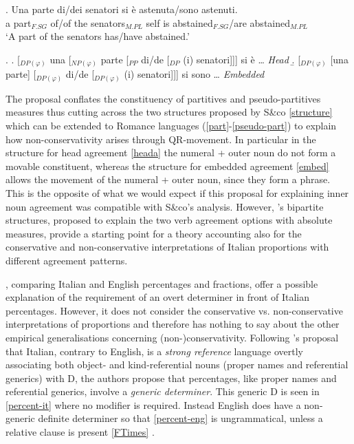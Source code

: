 \documentclass[charis, linguex]{glossa}
\newcommand{\citesax}[1]{\citeauthor{#1}'s \citeyearpar{#1}}
\begin{document}
\exg. Una parte di/dei senatori si è astenuta/sono astenuti. \\
      a   part$_{F.SG}$ of/{of the} senators$_{M.PL}$ self is abstained$_{F.SG}$/are abstained$_{M.PL}$ \\
	 \glt `A part of the senators has/have abstained.' \label{senator}

\ex. \a. [$_{DP(\varphi)}$ una [$_{NP(\varphi)}$ parte [$_{PP}$ di/de [$_{DP}$ (i) senatori]]] si \`{e} \ldots \label{heada} \hfill{\textit{Head}}
   \b. [$_{DP(\varphi)}$ [una parte] [$_{DP(\varphi)}$ di/de [$_{DP(\varphi)}$ (i) senatori]]] si sono \ldots \label{embed} \hfill{\textit{Embedded}}
	
The proposal conflates the constituency of partitives and pseudo-partitives measures thus cutting across the two structures proposed by S\&co \ref{structure} which can be extended to Romance languages (\ref{part}-\ref{pseudo-part}) to explain how non-conservativity arises through QR-movement. In particular in the structure for head agreement \ref{heada} the numeral + outer noun do not form a movable constituent, whereas the structure for embedded agreement \ref{embed} allows the movement of the numeral + outer noun, since they form a phrase. This is the opposite of what we would expect if this proposal for explaining inner noun agreement was compatible with S\&co's analysis. However, \citesax{man19} bipartite structures, proposed to explain the two verb agreement options with absolute measures, provide a starting point for a theory accounting also for the conservative and non-conservative interpretations of Italian proportions with different agreement patterns.

\citet[\S\S4.1]{fal19}, comparing Italian and English percentages and fractions, offer a possible explanation of the requirement of an overt determiner in front of Italian percentages. However, it does not consider the conservative vs. non-conservative interpretations of proportions and therefore has nothing to say about the other empirical generalisations concerning (non-)conservativity. Following \citesax{lon94} proposal that Italian, contrary to English, is a \textit{strong reference} language overtly associating both object- and kind-referential nouns (proper names and referential generics) with D, the authors propose that percentages, like proper names and referential generics, involve a \textit{generic determiner}.
This generic D is seen in \ref{percent-it} where no modifier is required. Instead English does have a non-generic definite determiner so that  \ref{percent-eng} is ungrammatical, unless a relative clause is present \ref{FTimes} \citep[ex.54,55,56]{fal19}. 
\end{document}
